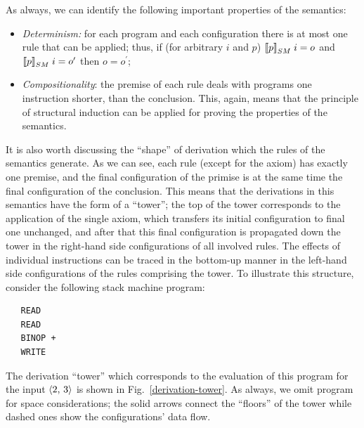 As always, we can identify the following important properties of the semantics:

\begin{itemize}
\item \emph{Determinism:} for each program and each configuration there is at most one rule that can be applied; thus, if (for arbitrary $i$ and $p$)
  $\sembr{p}^\ph_{SM}\;i=o$ and   $\sembr{p}^\ph_{SM}\;i=o^\prime$ then $o=o^\prime$;
\item \emph{Compositionality}: the premise of each rule deals with programs one instruction shorter, than the conclusion. This, again, means that
  the principle of structural induction can be applied for proving the properties of the semantics.
\end{itemize}

It is also worth discussing the ``shape'' of derivation which the rules of the semantics generate. As we can see, each rule (except for the axiom) has
exactly one premise, and the final configuration of the primise is at the same time the final configuration of the conclusion. This means that
the derivations in this semantics have the form of a ``tower''; the top of the tower corresponds to the application of the single axiom, which
transfers its initial configuration to final one unchanged, and after that this final configuration is propagated down the tower in the right-hand side
configurations of all involved rules. The effects of individual instructions can be traced in the bottom-up manner in the left-hand side configurations of the
rules comprising the tower. To illustrate this structure, consider the following stack machine program:

\begin{verbatim}
   READ
   READ
   BINOP +
   WRITE
\end{verbatim}

The derivation ``tower'' which corresponds to the evaluation of this program for the input $\left<{2,\,3}\right>$ is shown in Fig.~\ref{derivation-tower}. As always,
we omit program for space considerations; the solid arrows connect the ``floors'' of the tower while dashed ones show the configurations' data flow.

